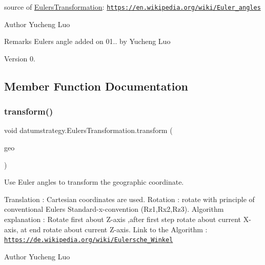 source of \hyperlink{classdatumstrategy_1_1_eulers_transformation}{Eulers\+Transformation}\+: \href{https://en.wikipedia.org/wiki/Euler_angles}{\tt https\+://en.\+wikipedia.\+org/wiki/\+Euler\+\_\+angles} \begin{DoxyAuthor}{Author}
Yucheng Luo 
\end{DoxyAuthor}
\begin{DoxyRemark}{Remarks}
Euler\textquotesingle{}s angle added on 01.. by Yucheng Luo 
\end{DoxyRemark}
\begin{DoxyVersion}{Version}
0. 
\end{DoxyVersion}


\subsection{Member Function Documentation}
\mbox{\label{classdatumstrategy_1_1_eulers_transformation_a37661559087a055288365ddebea5d699}} 
\subsubsection{\texorpdfstring{transform()}{transform()}}
{\footnotesize\ttfamily void datumstrategy.\+Eulers\+Transformation.\+transform (\begin{DoxyParamCaption}\item[{\hyperlink{classcoordinates_1_1_geographic_coordinate_interface}{Geographic\+Coordinate\+Interface}}]{geo }\end{DoxyParamCaption})}



Use Euler angles to transform the geographic coordinate. 

Translation \+: Cartesian coordinates are used. Rotation \+: rotate with principle of conventional Euler\textquotesingle{}s Standard-\/x-\/convention (Rz1,Rx2,Rz3). Algorithm explanation \+: Rotate first about Z-\/axis ,after first step rotate about current X-\/axis, at end rotate about current Z-\/axis. Link to the Algorithm \+: \href{https://de.wikipedia.org/wiki/Eulersche_Winkel}{\tt https\+://de.\+wikipedia.\+org/wiki/\+Eulersche\+\_\+\+Winkel}

\begin{DoxyAuthor}{Author}
Yucheng Luo 
\end{DoxyAuthor}


